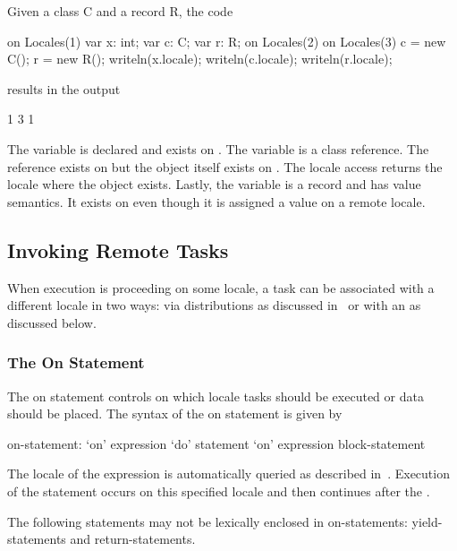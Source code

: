 \begin{example}
Given a class C and a record R, the code
\begin{chapel}
on Locales(1) {
  var x: int;
  var c: C;
  var r: R;
  on Locales(2) {
    on Locales(3) {
      c = new C();
      r = new R();
    }
    writeln(x.locale);
    writeln(c.locale);
    writeln(r.locale);
  }
}
\end{chapel}
results in the output
\begin{chapel}
1
3
1
\end{chapel}
The variable  is declared and exists on .
The variable  is a class reference.  The reference exists
on  but the object itself exists
on .  The locale access returns the locale where the
object exists.  Lastly, the variable  is a record and has
value semantics.  It exists on  even though it is
assigned a value on a remote locale.
\end{example}

\subsection{Invoking Remote Tasks}
\label{Specifying_Locales}

When execution is proceeding on some locale, a task can be associated
with a different locale in two ways: via distributions as discussed
in~ or with an  as discussed
below.

\subsubsection{The On Statement}
\label{On}

The on statement controls on which locale tasks should be executed or
data should be placed.  The syntax of the on statement is given by
\begin{syntax}
on-statement:
  `on' expression `do' statement
  `on' expression block-statement
\end{syntax}
The locale of the expression is automatically queried as described
in~.  Execution of the
statement occurs on this specified locale and then continues after
the .

The following statements may not be lexically enclosed in
on-statements: yield-statements and return-statements.

